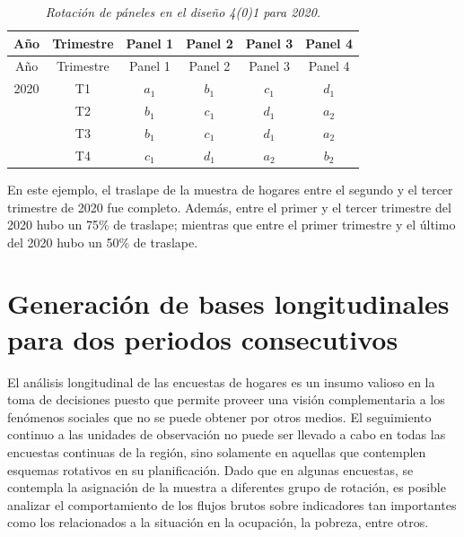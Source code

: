 \documentclass[
  12pt,
]{book}
\begin{document}
\begin{longtable}[]{@{}cccccc@{}}
\caption{\emph{Rotación de páneles en el diseño 4(0)1 para 2020.}}\tabularnewline
\toprule()
Año & Trimestre & Panel 1 & Panel 2 & Panel 3 & Panel 4 \\
\midrule()
\endfirsthead
\toprule()
Año & Trimestre & Panel 1 & Panel 2 & Panel 3 & Panel 4 \\
\midrule()
\endhead
2020 & T1 & \(a_1\) & \(b_1\) & \(c_1\) & \(d_1\) \\
& T2 & \(b_1\) & \(c_1\) & \(d_1\) & \(a_2\) \\
& T3 & \(b_1\) & \(c_1\) & \(d_1\) & \(a_2\) \\
& T4 & \(c_1\) & \(d_1\) & \(a_2\) & \(b_2\) \\
\bottomrule()
\end{longtable}

En este ejemplo, el traslape de la muestra de hogares entre el segundo y el tercer trimestre de 2020 fue completo. Además, entre el primer y el tercer trimestre del 2020 hubo un 75\% de traslape; mientras que entre el primer trimestre y el último del 2020 hubo un 50\% de traslape.

\hypertarget{generaciuxf3n-de-bases-longitudinales-para-dos-periodos-consecutivos}{%
\section{Generación de bases longitudinales para dos periodos consecutivos}\label{generaciuxf3n-de-bases-longitudinales-para-dos-periodos-consecutivos}}

El análisis longitudinal de las encuestas de hogares es un insumo valioso en la toma de decisiones puesto que permite proveer una visión complementaria a los fenómenos sociales que no se puede obtener por otros medios. El seguimiento continuo a las unidades de observación no puede ser llevado a cabo en todas las encuestas continuas de la región, sino solamente en aquellas que contemplen esquemas rotativos en su planificación. Dado que en algunas encuestas, se contempla la asignación de la muestra a diferentes grupo de rotación, es posible analizar el comportamiento de los flujos brutos sobre indicadores tan importantes como los relacionados a la situación en la ocupación, la pobreza, entre otros.
\end{document}
